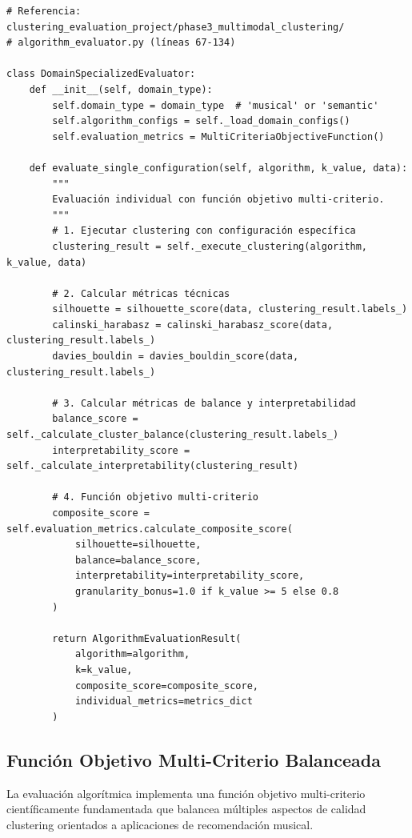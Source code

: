 \documentclass[12pt,a4paper]{report}
\begin{document}
\begin{lstlisting}[caption={Evaluadores Especializados por Dimensionalidad}]
# Referencia: clustering_evaluation_project/phase3_multimodal_clustering/
# algorithm_evaluator.py (líneas 67-134)

class DomainSpecializedEvaluator:
    def __init__(self, domain_type):
        self.domain_type = domain_type  # 'musical' or 'semantic'
        self.algorithm_configs = self._load_domain_configs()
        self.evaluation_metrics = MultiCriteriaObjectiveFunction()

    def evaluate_single_configuration(self, algorithm, k_value, data):
        """
        Evaluación individual con función objetivo multi-criterio.
        """
        # 1. Ejecutar clustering con configuración específica
        clustering_result = self._execute_clustering(algorithm, k_value, data)

        # 2. Calcular métricas técnicas
        silhouette = silhouette_score(data, clustering_result.labels_)
        calinski_harabasz = calinski_harabasz_score(data, clustering_result.labels_)
        davies_bouldin = davies_bouldin_score(data, clustering_result.labels_)

        # 3. Calcular métricas de balance y interpretabilidad
        balance_score = self._calculate_cluster_balance(clustering_result.labels_)
        interpretability_score = self._calculate_interpretability(clustering_result)

        # 4. Función objetivo multi-criterio
        composite_score = self.evaluation_metrics.calculate_composite_score(
            silhouette=silhouette,
            balance=balance_score,
            interpretability=interpretability_score,
            granularity_bonus=1.0 if k_value >= 5 else 0.8
        )

        return AlgorithmEvaluationResult(
            algorithm=algorithm,
            k=k_value,
            composite_score=composite_score,
            individual_metrics=metrics_dict
        )
\end{lstlisting}

\subsection{Función Objetivo Multi-Criterio Balanceada}

La evaluación algorítmica implementa una función objetivo multi-criterio científicamente fundamentada que balancea múltiples aspectos de calidad clustering orientados a aplicaciones de recomendación musical.
\end{document}
